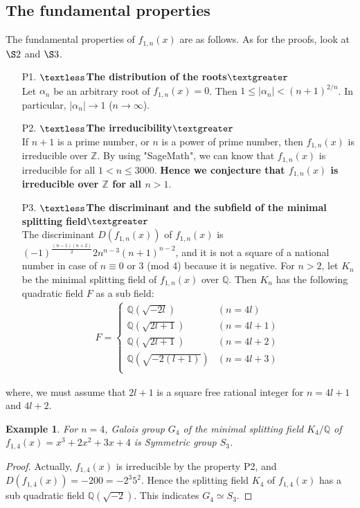 \documentclass{article}
\newtheorem{exam}{Example}[section]
\begin{document}
\subsection{The fundamental properties}
The fundamental properties of $f_{1,n}(x)$ are as follows. As for the proofs, look at $\S 2$ and $\S 3$.
\begin{enumerate}
	\item[P1.]$\textless${\bf The distribution of the roots}$\textgreater$\\
	Let $\alpha_{n}$ be an arbitrary root of $f_{1,n}(x)=0$. Then $1\leq |\alpha_{n}|<(n+1)^{2/n}$. In particular, $|\alpha_{n}|\to 1$ ($n\to \infty$).
	\\
	\item[P2.]$\textless${\bf The irreducibility}$\textgreater$\\
	If $n+1$ is a prime number, or $n$ is a power of prime number, then $f_{1,n}(x)$ is irreducible over $\mathbb{Z}$. By using "SageMath", we can know that $f_{1,n}(x)$ is irreducible for all $1< n \leq 3000$. {\bf Hence we conjecture that $f_{1,n}(x)$ is irreducible over $\mathbb{Z}$ for all $n > 1$}.
	\\
	\item[P3.]$\textless${\bf The discriminant and the subfield of the minimal splitting field}$\textgreater$\\
	The discriminant $D(f_{1,n}(x))$ of $f_{1,n}(x)$ is $(-1)^{\frac{(n-1)(n+2)}{2}}2n^{n-3}(n+1)^{n-2}$, and it is not a square of a national number in case of $n\equiv 0$ or $3$ (mod 4) because it is negative.  For $n>2$, let $K_{n}$ be the minimal splitting field of $f_{1,n}(x)$ over $\mathbb{Q}$. Then $K_{n}$ has the following quadratic field $F$ as a sub field:
\begin{eqnarray}
F=\left\{ \begin{array}{ll}
\mathbb{Q}(\sqrt{-2l}) & (n=4l) \\
\mathbb{Q}(\sqrt{2l+1})  & (n=4l+1) \\
\mathbb{Q}(\sqrt{2l+1})  & (n=4l+2) \\
\mathbb{Q}(\sqrt{-2(l+1)})  & (n=4l+3) \\
\end{array} \right.
\end{eqnarray}
\end{enumerate}
where, we must assume that $2l+1$ is a square free rational integer for $n=4l+1$ and $4l+2$. 
\\

\begin{exam}
\upshape
For $n=4$, Galois group $G_{4}$ of the minimal splitting field $K_{4}/\mathbb{Q}$ of $f_{1,4}(x) = x^3 + 2x^2 + 3x + 4$ is Symmetric group $S_{3}$.
\end{exam}
\begin{proof}
Actually, $f_{1,4}(x)$ is irreducible by the property P2, and $D(f_{1,4}(x)) = -200 = -2^{3}5^{2}$. Hence the splitting field $K_{4}$ of  $f_{1,4}(x)$ has a sub quadratic field $\mathbb{Q}(\sqrt{-2})$. This indicates $G_{4}\simeq  S_{3}$.
\end{proof}
\end{document}

